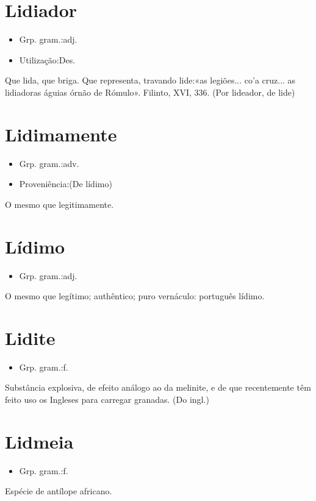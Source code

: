 \section{Lidiador}
\begin{itemize}
\item {Grp. gram.:adj.}
\end{itemize}
\begin{itemize}
\item {Utilização:Des.}
\end{itemize}
Que lida, que briga.
Que representa, travando lide:«\textunderscore as legiões... co'a cruz... as lidiadoras águias órnão de Rómulo\textunderscore ». Filinto, XVI, 336.
(Por \textunderscore lideador\textunderscore , de \textunderscore lide\textunderscore )
\section{Lidimamente}
\begin{itemize}
\item {Grp. gram.:adv.}
\end{itemize}
\begin{itemize}
\item {Proveniência:(De \textunderscore lídimo\textunderscore )}
\end{itemize}
O mesmo que \textunderscore legitimamente\textunderscore .
\section{Lídimo}
\begin{itemize}
\item {Grp. gram.:adj.}
\end{itemize}
O mesmo que \textunderscore legítimo\textunderscore ; authêntico; puro vernáculo: \textunderscore português lídimo\textunderscore .
\section{Lidite}
\begin{itemize}
\item {Grp. gram.:f.}
\end{itemize}
Substância explosiva, de efeito análogo ao da melinite, e de que recentemente têm feito uso os Ingleses para carregar granadas.
(Do ingl.)
\section{Lidmeia}
\begin{itemize}
\item {Grp. gram.:f.}
\end{itemize}
Espécie de antílope africano.
